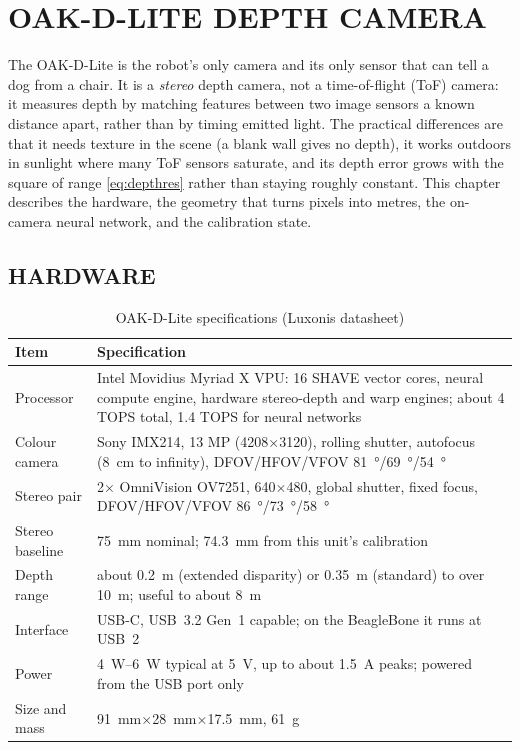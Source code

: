 \chapter{OAK-D-LITE DEPTH CAMERA}
\label{ch:camera}

The OAK-D-Lite is the robot's only camera and its only sensor that can tell
a dog from a chair. It is a \emph{stereo} depth camera, not a time-of-flight
(ToF) camera: it measures depth by matching features between two image
sensors a known distance apart, rather than by timing emitted light. The
practical differences are that it needs texture in the scene (a blank wall
gives no depth), it works outdoors in sunlight where many ToF sensors
saturate, and its depth error grows with the square of range
\eqref{eq:depthres} rather than staying roughly constant. This chapter
describes the hardware, the geometry that turns pixels into metres, the
on-camera neural network, and the calibration state.

\section{HARDWARE}
\label{sec:oakhw}

\begin{table}[htbp]
\centering
\caption{OAK-D-Lite specifications (Luxonis datasheet)}
\label{tab:oak}
\small
\begin{tabularx}{\linewidth}{lX}
\toprule
Item & Specification \\
\midrule
Processor & Intel Movidius Myriad X VPU: 16 SHAVE vector cores, neural compute engine, hardware stereo-depth and warp engines; about 4 TOPS total, 1.4 TOPS for neural networks \\
Colour camera & Sony IMX214, 13 MP (4208$\times$3120), rolling shutter, autofocus (\SI{8}{cm} to infinity), DFOV/HFOV/VFOV \SI{81}{\degree}/\SI{69}{\degree}/\SI{54}{\degree} \\
Stereo pair & 2$\times$ OmniVision OV7251, 640$\times$480, global shutter, fixed focus, DFOV/HFOV/VFOV \SI{86}{\degree}/\SI{73}{\degree}/\SI{58}{\degree} \\
Stereo baseline & \SI{75}{mm} nominal; \SI{74.3}{mm} from this unit's calibration \\
Depth range & about \SI{0.2}{m} (extended disparity) or \SI{0.35}{m} (standard) to over \SI{10}{m}; useful to about \SI{8}{m} \\
Interface & USB-C, USB~3.2 Gen~1 capable; on the BeagleBone it runs at USB~2 \\
Power & \SIrange{4}{6}{W} typical at \SI{5}{V}, up to about \SI{1.5}{A} peaks; powered from the USB port only \\
Size and mass & \SI{91}{mm}$\times$\SI{28}{mm}$\times$\SI{17.5}{mm}, \SI{61}{g} \\
\bottomrule
\end{tabularx}
\end{table}

